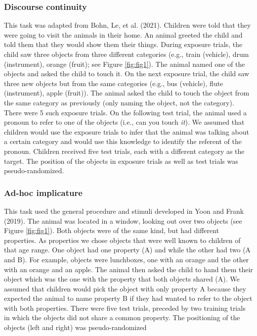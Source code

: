 \documentclass[
  man,floatsintext]{apa6}
\begin{document}
\hypertarget{discourse-continuity}{%
\subsubsection{Discourse continuity}\label{discourse-continuity}}

This task was adapted from Bohn, Le, et al. (2021). Children were told that they were going to visit the animals in their home. An animal greeted the child and told them that they would show them their things. During exposure trials, the child saw three objects from three different categories (e.g., train (vehicle), drum (instrument), orange (fruit); see Figure \ref{fig:fig1}). The animal named one of the objects and asked the child to touch it. On the next exposure trial, the child saw three new objects but from the same categories (e.g., bus (vehicle), flute (instrument), apple (fruit)). The animal asked the child to touch the object from the same category as previously (only naming the object, not the category). There were 5 such exposure trials. On the following test trial, the animal used a pronoun to refer to one of the objects (i.e., can you touch \emph{it}). We assumed that children would use the exposure trials to infer that the animal was talking about a certain category and would use this knowledge to identify the referent of the pronoun. Children received five test trials, each with a different category as the target. The position of the objects in exposure trials as well as test trials was pseudo-randomized.

\hypertarget{ad-hoc-implicature}{%
\subsubsection{Ad-hoc implicature}\label{ad-hoc-implicature}}

This task used the general procedure and stimuli developed in Yoon and Frank (2019). The animal was located in a window, looking out over two objects (see Figure \ref{fig:fig1}). Both objects were of the same kind, but had different properties. As properties we chose objects that were well known to children of that age range. One object had one property (A) and while the other had two (A and B). For example, objects were lunchboxes, one with an orange and the other with an orange and an apple. The animal then asked the child to hand them their object which was the one with the property that both objects shared (A). We assumed that children would pick the object with only property A because they expected the animal to name property B if they had wanted to refer to the object with both properties. There were five test trials, preceded by two training trials in which the objects did not share a common property. The positioning of the objects (left and right) was pseudo-randomized
\end{document}
